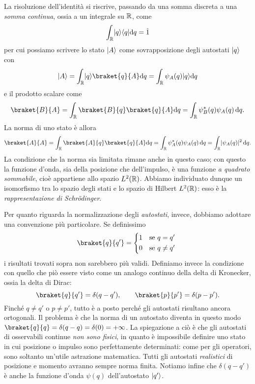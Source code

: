 La risoluzione dell'identità si riscrive, passando da una somma discreta a una \emph{somma continua}, ossia a un integrale su $\R$, come
\begin{equation}
	\int_\R\ket{q}\bra{q}\dd q=\op 1
	\label{eq:risoluzione-identita-continua}
\end{equation}
per cui possiamo scrivere lo stato $\ket{A}$ come sovrapposizione degli autostati $\ket{q}$ con
\begin{equation}
	\ket{A}=\int_\R\ket{q}\braket{q}{A}\dd q=\int_\R\psi_A(q)\ket{q}\dd q
	\label{eq:sovrapposizione-stati-continuo}
\end{equation}
e il prodotto scalare come
\begin{equation}
	\braket{B}{A}=\int_\R\braket{B}{q}\braket{q}{A}\dd q=\int_\R\psi_B^*(q)\psi_A(q)\,\dd q.
	\label{eq:prodotto-scalare-continuo}
\end{equation}
La norma di uno stato è allora
\begin{equation}
	\braket{A}{A}=\int_\R\braket{A}{q}\braket{q}{A}\dd q=\int_\R\psi_A^*(q)\psi_A(q)\,\dd q=\int_\R\abs{\psi_A(q)}^2\,\dd q.
	\label{eq:norma-stato-continuo}
\end{equation}
La condizione che la norma sia limitata rimane anche in questo caso; con questo la funzione d'onda, sia della posizione che dell'impulso, è una funzione \emph{a quadrato sommabile}, cioè appartiene allo spazio $\leb[2]{\R}$.
Abbiamo individuato dunque un isomorfismo tra lo spazio degli stati e lo spazio di Hilbert $\leb[2]{\R}$: esso è la \emph{rappresentazione di Schr\"odinger}.

Per quanto riguarda la normalizzazione degli \emph{autostati}, invece, dobbiamo adottare una convenzione più particolare.
Se definissimo
\begin{equation}
	\braket{q}{q'}=
	\begin{cases*}
		1& se $q=q'$\\ 0& se $q\ne q'$
	\end{cases*}
\end{equation}
i risultati trovati sopra non sarebbero più validi.
Definiamo invece la condizione con quello che piò essere visto come un analogo continuo della delta di Kronecker, ossia la delta di Dirac:
\begin{equation}
	\braket{q}{q'}=\delta(q-q'),\qquad\braket{p}{p'}=\delta(p-p').
	\label{eq:normalizzazione-autostati-continui}
\end{equation}
Finch\'e $q\ne q'$ o $p\ne p'$, tutto è a posto perch\'e gli autostati risultano ancora ortogonali.
Il problema è che la norma di un autostato diventa in questo modo $\braket{q}{q}=\delta(q-q)=\delta(0)=+\infty$.
La spiegazione a ciò è che gli autostati di osservabili continue \emph{non sono fisici}, in quanto è impossibile definire uno stato in cui posizione o impulso sono perfettamente determinati: come per gli operatori, sono soltanto un'utile astrazione matematica.
Tutti gli autostati \emph{realistici} di posizione e momento avranno sempre norma finita.
Notiamo infine che $\delta(q-q')$ è anche la funzione d'onda $\psi(q)$ dell'autostato $\ket{q'}$.

